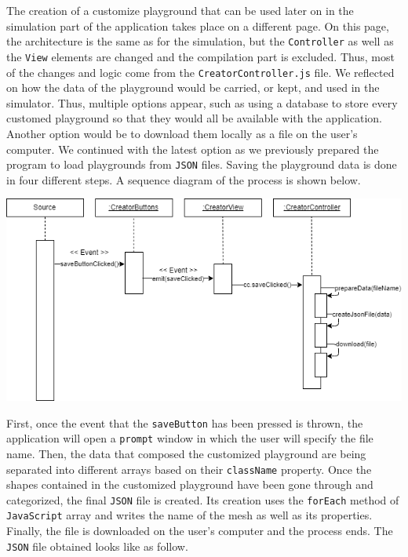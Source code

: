 \documentclass{scrreprt}
\begin{document}
The creation of a customize playground that can be used later on in the simulation part of the application takes place on a different page. On this page, the architecture is the same as for the simulation, but the \texttt{Controller} as well as the \texttt{View} elements are changed
and the compilation part is excluded. Thus, most of the changes and logic come from the \texttt{CreatorController.js} file. We reflected on how the data of the playground would be carried, or kept, and used in the simulator. Thus, multiple options appear,
such as using a database to store every customed playground so that they would all be available with the application. Another option would be to download them locally as a file on the user's computer. We continued with the latest option as we previously prepared the program to load playgrounds from \texttt{JSON} files.
Saving the playground data is done in four different steps. A sequence diagram of the process is shown below.

\begin{center}
  \includegraphics[scale=0.55]{./savepg_sd}
\end{center}

First, once the event that the \texttt{saveButton} has been pressed is thrown, the application will open a \texttt{prompt} window in which the user will specify the file name. Then, the data that composed the customized playground are being separated into different arrays based on their \texttt{className} property. 
Once the shapes contained in the customized playground have been gone through and categorized, the final \texttt{JSON} file is created. Its creation uses the \texttt{forEach} method of \texttt{JavaScript} array and writes the name of the mesh as well as its properties. 
Finally, the file is downloaded on the user's computer and the process ends. The \texttt{JSON} file obtained looks like as follow.
\end{document}
